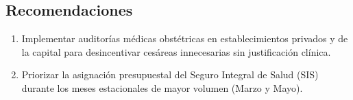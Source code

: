 \documentclass[12pt,a4paper]{article}
\begin{document}
\subsection{Recomendaciones}
\begin{enumerate}
    \item Implementar auditorías médicas obstétricas en establecimientos privados y de la capital para desincentivar cesáreas innecesarias sin justificación clínica.
    \item Priorizar la asignación presupuestal del Seguro Integral de Salud (SIS) durante los meses estacionales de mayor volumen (Marzo y Mayo).
\end{enumerate}
\end{document}
